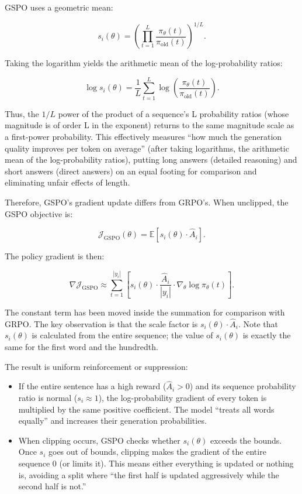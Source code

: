 GSPO uses a geometric mean:

\[
s_i(\theta)
=
\left(
\prod_{t=1}^{L}
\frac{\pi_\theta(t)}
{\pi_{\mathrm{old}}(t)}
\right)^{1/L}.
\]

Taking the logarithm yields the arithmetic mean of the log-probability ratios:

\[
\log s_i(\theta)
=
\frac{1}{L}
\sum_{t=1}^{L}
\log\left(
\frac{\pi_\theta(t)}
{\pi_{\mathrm{old}}(t)}
\right).
\]

Thus, the \(1/L\) power of the product of a sequence's L probability ratios (whose magnitude is of order L in the exponent) returns to the same magnitude scale as a first-power probability. This effectively measures ``how much the generation quality improves per token on average'' (after taking logarithms, the arithmetic mean of the log-probability ratios), putting long answers (detailed reasoning) and short answers (direct answers) on an equal footing for comparison and eliminating unfair effects of length.

Therefore, GSPO's gradient update differs from GRPO's. When unclipped, the GSPO objective is:

\[
\mathcal{J}_{\mathrm{GSPO}}(\theta)
=
\mathbb{E}
\left[
s_i(\theta)\cdot \hat{A}_i
\right].
\]

The policy gradient is then:

\[
\nabla \mathcal{J}_{\mathrm{GSPO}}
\approx
\sum_{t=1}^{|y_i|}
\left[
s_i(\theta)
\cdot
\frac{\hat{A}_i}{|y_i|}
\cdot
\nabla_\theta \log \pi_\theta(t)
\right].
\]

The constant term has been moved inside the summation for comparison with GRPO. The key observation is that the scale factor is \(s_i(\theta)\cdot \hat{A}_i\). Note that \(s_i(\theta)\) is calculated from the entire sequence; the value of \(s_i(\theta)\) is exactly the same for the first word and the hundredth.

The result is uniform reinforcement or suppression:

\begin{itemize}
\tightlist
\item
  If the entire sentence has a high reward (\(\hat{A}_i>0\)) and its sequence probability ratio is normal (\(s_i\approx 1\)), the log-probability gradient of every token is multiplied by the same positive coefficient. The model ``treats all words equally'' and increases their generation probabilities.
\item
  When clipping occurs, GSPO checks whether \(s_i(\theta)\) exceeds the bounds. Once \(s_i\) goes out of bounds, clipping makes the gradient of the entire sequence 0 (or limits it). This means either everything is updated or nothing is, avoiding a split where ``the first half is updated aggressively while the second half is not.''
\end{itemize}

